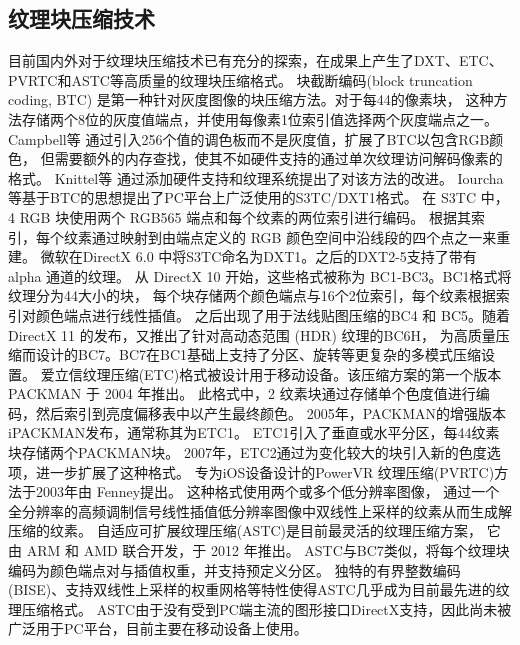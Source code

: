 \subsection{纹理块压缩技术}
目前国内外对于纹理块压缩技术已有充分的探索，在成果上产生了DXT、ETC、PVRTC和ASTC等高质量的纹理块压缩格式。
块截断编码(block truncation coding, BTC)\cite{delp1979image}
是第一种针对灰度图像的块压缩方法。对于每4\times4的像素块，
这种方法存储两个8位的灰度值端点，并使用每像素1位索引值选择两个灰度端点之一。
Campbell等\cite{campbell1986two}
通过引入256个值的调色板而不是灰度值，扩展了BTC以包含RGB颜色，
但需要额外的内存查找，使其不如硬件支持的通过单次纹理访问解码像素的格式。 
Knittel等\cite{knittel1996hardware}
通过添加硬件支持和纹理系统提出了对该方法的改进。
Iourcha等\cite{iourcha1999system}基于BTC的思想提出了PC平台上广泛使用的S3TC/DXT1格式。
在 S3TC 中，4 RGB 块使用两个 RGB565 端点和每个纹素的两位索引进行编码。
根据其索引，每个纹素通过映射到由端点定义的 RGB 颜色空间中沿线段的四个点之一来重建。
微软在DirectX 6.0 中将S3TC命名为DXT1。之后的DXT2-5支持了带有 alpha 通道的纹理。
从 DirectX 10 开始，这些格式被称为 BC1-BC3。BC1格式将纹理分为4\times4大小的块，
每个块存储两个颜色端点与16个2位索引，每个纹素根据索引对颜色端点进行线性插值。
之后出现了用于法线贴图压缩的BC4 和 BC5。随着 DirectX 11 的发布，又推出了针对高动态范围 (HDR) 纹理的BC6H，
为高质量压缩而设计的BC7。BC7在BC1基础上支持了分区、旋转等更复杂的多模式压缩设置。
爱立信纹理压缩(ETC)格式被设计用于移动设备。该压缩方案的第一个版本 PACKMAN\cite{strom2004packman} 于 2004 年推出。
此格式中，2 纹素块通过存储单个色度值进行编码，然后索引到亮度偏移表中以产生最终颜色。
2005年，PACKMAN的增强版本iPACKMAN\cite{strom2005packman}发布，通常称其为ETC1。
ETC1引入了垂直或水平分区，每4\times4纹素块存储两个PACKMAN块。
2007年，ETC2\cite{strom2007etc}通过为变化较大的块引入新的色度选项，进一步扩展了这种格式。
专为iOS设备设计的PowerVR 纹理压缩(PVRTC)方法于2003年由 Fenney\cite{fenney2003texture}提出。
这种格式使用两个或多个低分辨率图像，
通过一个全分辨率的高频调制信号线性插值低分辨率图像中双线性上采样的纹素从而生成解压缩的纹素。
自适应可扩展纹理压缩(ASTC)\cite{nystad2012adaptive}是目前最灵活的纹理压缩方案，
它由 ARM 和 AMD 联合开发，于 2012 年推出。
ASTC与BC7类似，将每个纹理块编码为颜色端点对与插值权重，并支持预定义分区。
独特的有界整数编码(BISE)、支持双线性上采样的权重网格等特性使得ASTC几乎成为目前最先进的纹理压缩格式。
ASTC由于没有受到PC端主流的图形接口DirectX支持，因此尚未被广泛用于PC平台，目前主要在移动设备上使用\cite{vaidyanathan2023random}。

